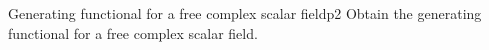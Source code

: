 \begin{problem}{Generating functional for a free complex scalar field}{p2}
    Obtain the generating functional for a free complex scalar field.
\end{problem}
